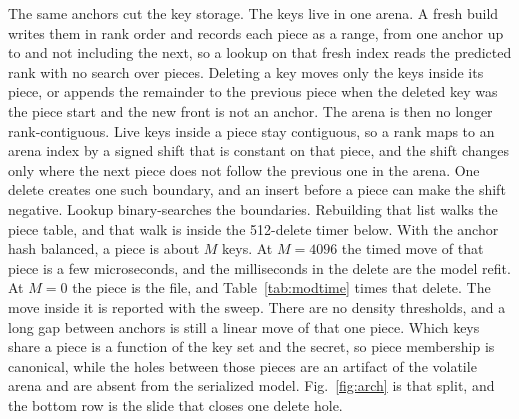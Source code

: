 \documentclass[conference]{IEEEtran}
\begin{document}
The same anchors cut the key storage.
The keys live in one arena.
A fresh build writes them in rank order and records each piece as a range, from one anchor up to and not including the next, so a lookup on that fresh index reads the predicted rank with no search over pieces.
Deleting a key moves only the keys inside its piece, or appends the remainder to the previous piece when the deleted key was the piece start and the new front is not an anchor.
The arena is then no longer rank-contiguous.
Live keys inside a piece stay contiguous, so a rank maps to an arena index by a signed shift that is constant on that piece, and the shift changes only where the next piece does not follow the previous one in the arena.
One delete creates one such boundary, and an insert before a piece can make the shift negative.
Lookup binary-searches the boundaries.
Rebuilding that list walks the piece table, and that walk is inside the 512-delete timer below.
With the anchor hash balanced, a piece is about $M$ keys.
At $M=4096$ the timed move of that piece is a few microseconds, and the milliseconds in the delete are the model refit.
At $M=0$ the piece is the file, and Table~\ref{tab:modtime} times that delete. The move inside it is reported with the sweep.
There are no density thresholds, and a long gap between anchors is still a linear move of that one piece.
Which keys share a piece is a function of the key set and the secret, so piece membership is canonical, while the holes between those pieces are an artifact of the volatile arena and are absent from the serialized model.
Fig.~\ref{fig:arch} is that split, and the bottom row is the slide that closes one delete hole.
\end{document}
